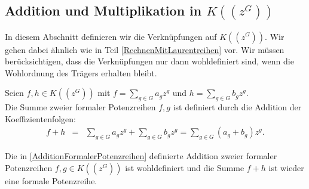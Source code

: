 \subsection{Addition und Multiplikation in $K((z^{G}))$}
%
%
%
%
%
%
In diesem Abschnitt definieren wir die Verknüpfungen auf $K((z^{G}))$. Wir gehen dabei ähnlich wie in Teil \ref{RechnenMitLaurentreihen} vor. Wir müssen berücksichtigen, dass die Verknüpfungen nur dann wohldefiniert sind, wenn die Wohlordnung des Trägers erhalten bleibt.
%
%
%
%
%
%
%
%
%
\begin{defn}\label{AdditionFormalerPotenzreihen}
Seien $f, h \in K\left(\left(z^G\right)\right)$ mit $f = \sum_{g \in G}^{} a_g z^g \text{ und } h = \sum_{g \in G}^{} b_g z^g$.\\
Die Summe zweier formaler Potenzreihen $f, g$ ist definiert durch die Addition der Koeffizientenfolgen:
\begin{eqnarray*}
f + h &=& \sum_{g \in G}^{} a_g z^g + \sum_{g \in G}^{} b_g z^g
= \sum_{g \in G}^{}\left(a_g + b_g\right)z^g. 
\end{eqnarray*}
\end{defn}
%
%
%
%
%
\begin{satz}\label{wohldefiniertheitAddition}
Die in \ref{AdditionFormalerPotenzreihen} definierte Addition zweier formaler Potenzreihen $f, g \in K\left(\left(z^{G}\right)\right)$ ist wohldefiniert und die Summe $f +h$ ist wieder eine formale Potenzreihe.
\end{satz}
